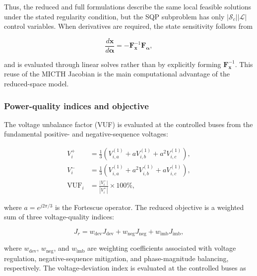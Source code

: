 \documentclass[journal]{IEEEtran}
\begin{document}
Thus, the reduced and full formulations describe the same local feasible
solutions under the stated regularity condition, but the SQP subproblem has
only $|\mathcal{S}_c||\mathcal{L}|$ control variables. When derivatives are
required, the state sensitivity follows from

\begin{equation}
    \frac{d\mathbf{x}}{d\boldsymbol{\alpha}}
    =-\mathbf{F}_{\mathbf{x}}^{-1}\mathbf{F}_{\boldsymbol{\alpha}},
    \label{eq:reduced_state_sensitivity}
\end{equation}

\noindent and is evaluated through linear solves rather than by explicitly
forming $\mathbf{F}_{\mathbf{x}}^{-1}$. This reuse of the MICTH Jacobian is the
main computational advantage of the reduced-space model.

\subsubsection{Power-quality indices and objective}

The voltage unbalance factor (VUF) is evaluated at the controlled buses from
the fundamental positive- and negative-sequence voltages:

\begin{subequations}
\label{eq:vuf}
\begin{align}
    V_i^{+} &= \frac{1}{3}\left(V_{i,a}^{(1)} + a V_{i,b}^{(1)}
              + a^2 V_{i,c}^{(1)}\right), \\
    V_i^{-} &= \frac{1}{3}\left(V_{i,a}^{(1)} + a^2 V_{i,b}^{(1)}
              + a V_{i,c}^{(1)}\right), \\
    \mathrm{VUF}_i &= \frac{\left|V_i^{-}\right|}{\left|V_i^{+}\right|}
                     \times 100\%,
\end{align}
\end{subequations}

\noindent where $a=e^{j2\pi/3}$ is the Fortescue operator. The reduced
objective is a weighted sum of three voltage-quality indices:

\begin{equation}
    J_r = w_{\mathrm{dev}}J_{\mathrm{dev}}
      + w_{\mathrm{neg}}J_{\mathrm{neg}}
      + w_{\mathrm{imb}}J_{\mathrm{imb}},
    \label{eq:objfull}
\end{equation}

\noindent where $w_{\mathrm{dev}}$, $w_{\mathrm{neg}}$, and
$w_{\mathrm{imb}}$ are weighting coefficients associated with voltage
regulation, negative-sequence mitigation, and phase-magnitude balancing,
respectively. The voltage-deviation index is evaluated at the controlled buses
as
\end{document}

